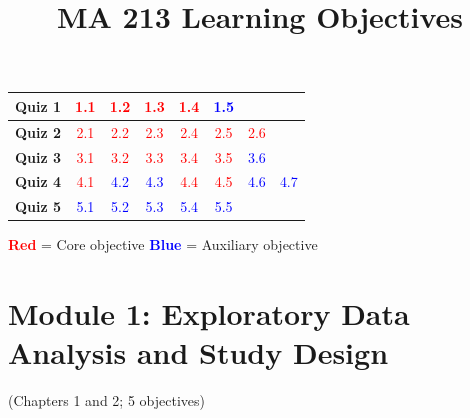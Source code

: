 \documentclass[12pt]{article}
\begin{document}

\title{MA 213 Learning Objectives}
\date{}
\maketitle

\begin{center}
{\renewcommand{\arraystretch}{1.6}
\begin{tabular}{|>{\bfseries}l|c|c|c|c|c|c|c|}
\hline
\cellcolor{gray!30}Quiz 1 & \textcolor{red}{1.1} & \textcolor{red}{1.2} & \textcolor{red}{1.3} & \textcolor{red}{1.4} & \textcolor{blue}{1.5} & & \\
\hline
\cellcolor{gray!30}Quiz 2 & \textcolor{red}{2.1} & \textcolor{red}{2.2} & \textcolor{red}{2.3} & \textcolor{red}{2.4} & \textcolor{red}{2.5} & \textcolor{red}{2.6} & \\
\hline
\cellcolor{gray!30}Quiz 3 & \textcolor{red}{3.1} & \textcolor{red}{3.2} & \textcolor{red}{3.3} & \textcolor{red}{3.4} & \textcolor{red}{3.5} & \textcolor{blue}{3.6} & \\
\hline
\cellcolor{gray!30}Quiz 4 & \textcolor{red}{4.1} & \textcolor{blue}{4.2} & \textcolor{blue}{4.3} & \textcolor{red}{4.4} & \textcolor{red}{4.5} & \textcolor{blue}{4.6} & \textcolor{blue}{4.7} \\
\hline
\cellcolor{gray!30}Quiz 5 & \textcolor{blue}{5.1} & \textcolor{blue}{5.2} & \textcolor{blue}{5.3} & \textcolor{blue}{5.4} & \textcolor{blue}{5.5} & & \\
\hline
\end{tabular}}
\end{center}

\noindent\textcolor{red}{\textbf{Red}} = Core objective \quad \textcolor{blue}{\textbf{Blue}} = Auxiliary objective

\bigskip


\section{Module 1: Exploratory Data Analysis and Study Design}
(Chapters 1 and 2; 5 objectives)

\end{document}
